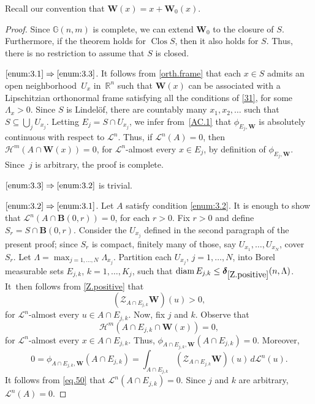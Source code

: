 \documentclass[JEP,XML,SOM,Unicode,ThmDefs,NoEqCountersInSection]{cedram}
\newcommand{\R}{\mathbb{R}}
\newcommand{\Rn}{\R^n}
\newcommand{\calH}{\mathscr{H}}
\newcommand{\calL}{\mathscr{L}}
\newcommand{\calZ}{\mathscr{Z}}
\newcommand{\bdelta}{\boldsymbol{\delta}}
\newcommand{\bB}{{\boldsymbol{B}}}
\newcommand{\bW}{{\boldsymbol{W}}}
\newcommand{\bG}{\mathbb{G}}
\DeclareMathOperator{\rmClos}{\mathrm{Clos}}
\DeclareMathOperator{\rmdiam}{\mathrm{diam}}
\let\subset\subseteq
\begin{document}
Recall our convention that $\bW(x) = x + \bW_0(x)$.

\begin{proof}
Since $\bG(n,m)$ is complete, we can extend $\bW_0$ to the closure of $S$.
Furthermore, if the theorem holds for $\rmClos S$, then it also holds for $S$.
Thus, there is no restriction to assume that $S$ is closed.
\par
$\eqref{enum:3.1} \Rightarrow \eqref{enum:3.3}$. It follows from \ref{orth.frame} that each $x \in S$ admits an open neighborhood~$U_x$ in~$\Rn$ such that $\bW(x)$ can be associated with a Lipschitzian orthonormal frame satisfying all the conditions of \ref{31}, for some $\Lambda_x > 0$.
Since $S$ is Lindel\"of, there are countably many $x_1,x_2,\ldots$ such that $S \subset \bigcup_j U_{x_j}$.
Letting $E_j = S \cap U_{x_j}$, we infer from~\ref{AC.1} that $\phi_{E_j,\bW}$ is absolutely continuous with respect to $\calL^n$.
Thus, if $\calL^n(A)=0$, then $\calH^m\left(A \cap \bW(x)\right)=0$, for $\calL^n$-almost every $x \in E_j$, by definition of $\phi_{E_j,\bW}$.
Since~$j$ is arbitrary, the proof is complete.
\par
$\eqref{enum:3.3} \Rightarrow \eqref{enum:3.2}$ is trivial.
\par
$\eqref{enum:3.2}\Rightarrow \eqref{enum:3.1}$. Let $A$ satisfy condition \eqref{enum:3.2}.
It is enough to show that \hbox{$\calL^n(A \!\cap\! \bB(0,r)) \!=\! 0$}, for each $r > 0$.
Fix $r > 0$ and define $S_r = S \cap \bB(0,r)$.
Consider the $U_{x_j}$ defined in the second paragraph of the present proof; since $S_r$ is compact, finitely many of those, say $U_{x_1},\ldots,U_{x_N}$, cover $S_r$.
Let $\Lambda = \max_{j=1,\ldots,N} \Lambda_{x_j}$.
Partition each $U_{x_j}$, $j=1,\ldots,N$, into Borel measurable sets $E_{j,k}$, $k=1,\ldots,
K_j$, such that $\rmdiam E_{j,k} \leq \bdelta_{\ref{Z.positive}}(n,\Lambda)$.
It~then follows from \ref{Z.positive} that
\begin{equation}
\label{eq.50}
\left(\calZ_{A \cap E_{j,k}} \bW \right)(u) > 0,
\end{equation}
for $\calL^n$-almost every $u \in A \cap E_{j,k}$.
Now, fix $j$ and $k$.
Observe that
\[
\calH^m \left(A \cap E_{j,k} \cap \bW(x) \right) = 0,
\]
for $\calL^n$-almost every $x \in A \cap E_{j,k}$.
Thus, $\phi_{A \cap E_{j,k},\bW}(A \cap E_{j,k}) =0$.
Moreover,
\begin{equation*}
0 = \phi_{A \cap E_{j,k},\bW}\left(A \cap E_{j,k}\right) = \int_{A \cap E_{j,k}} \left(\calZ_{A \cap E_{j,k}} \bW \right)(u) \,d\calL^n(u).
\end{equation*}
It follows from \eqref{eq.50} that $\calL^n(A \cap E_{j,k}) =0$.
Since $j$ and $k$ are arbitrary, \hbox{$\calL^n(A)=0$}.
\end{proof}
\end{document}
